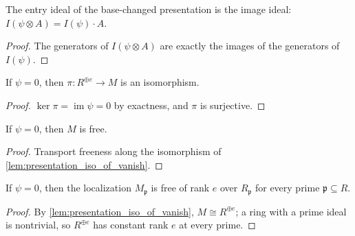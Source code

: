\begin{lemma}
  \label{lem:entry_ideal_base_change}
  \leanok
  The entry ideal of the base-changed presentation is the image ideal:
  \(I(\psi \otimes A) = I(\psi) \cdot A\).
\end{lemma}

\begin{proof}
  \leanok
  The generators of \(I(\psi \otimes A)\) are exactly the images of the
  generators of \(I(\psi)\).
\end{proof}

\begin{lemma}
  \label{lem:presentation_iso_of_vanish}
  \leanok
  If \(\psi = 0\), then \(\pi : R^{\oplus e} \to M\) is an isomorphism.
\end{lemma}

\begin{proof}
  \leanok
  \(\ker \pi = \operatorname{im} \psi = 0\) by exactness, and \(\pi\) is
  surjective.
\end{proof}

\begin{lemma}
  \label{lem:presentation_free_of_vanish}
  \leanok
  If \(\psi = 0\), then \(M\) is free.
\end{lemma}

\begin{proof}
  \leanok
  Transport freeness along the isomorphism of
  \cref{lem:presentation_iso_of_vanish}.
\end{proof}

\begin{lemma}
  \label{lem:presentation_rank_of_vanish}
  \leanok
  If \(\psi = 0\), then the localization \(M_{\mathfrak p}\) is free of rank
  \(e\) over \(R_{\mathfrak p}\) for every prime
  \(\mathfrak p \subseteq R\).
\end{lemma}

\begin{proof}
  \leanok
  By \cref{lem:presentation_iso_of_vanish}, \(M \cong R^{\oplus e}\); a ring
  with a prime ideal is nontrivial, so \(R^{\oplus e}\) has constant rank
  \(e\) at every prime.
\end{proof}

